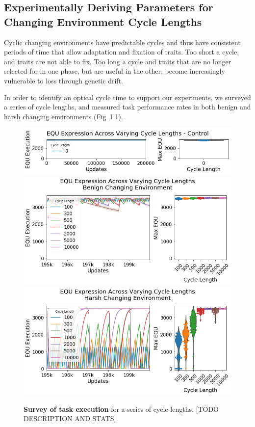 \documentclass[PhD]{msu-thesis}
\begin{document}
\begin{appendices}
\chapter{Experimentally Deriving Parameters for Changing Environment Cycle Lengths}
\label{appendix:ce_sweep}
Cyclic changing environments have predictable cycles and thus have consistent periods of time that allow adaptation and fixation of traits. Too short a cycle, and traits are not able to fix. Too long a cycle and traits that are no longer selected for in one phase, but are useful in the other, become increasingly vulnerable to loss through genetic drift.

In order to identify an optical cycle time to support our experiments, we surveyed a series of cycle lengths, and measured task performance rates in both benign and harsh changing environments (Fig~\ref{fig:a1-taskexpression}).

	\begin{figure}[!h]

	\includegraphics[trim={0 0 0 0}, clip, width=0.75\columnwidth]{figures/A1/a1-taskexpression-control.png}
	\includegraphics[trim={0 0 0 0}, clip, width=0.75\columnwidth]{figures/A1/a1-taskexpression-benign.png}
	\includegraphics[trim={0 0 0 0}, clip, width=0.75\columnwidth]{figures/A1/a1-taskexpression-harsh.png}
	\caption{\textbf{Survey of task execution} for a series of cycle-lengths. [TODO DESCRIPTION AND STATS]%
	}
	\label{fig:a1-taskexpression}
	\end{figure}


\end{appendices}
\end{document}
